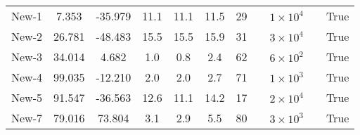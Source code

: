 \begin{table}
\begin{tabular}{ccccccccccc}
New-1 & 7.353 & -35.979 & 11.1 & 11.1 & 11.5 & 29 & \citet{ibata:2023} & $1 \times 10^{4}$ &  & True \\
New-2 & 26.781 & -48.483 & 15.5 & 15.5 & 15.9 & 31 & \citet{ibata:2023} & $3 \times 10^{4}$ &  & True \\
New-3 & 34.014 & 4.682 & 1.0 & 0.8 & 2.4 & 62 & \citet{ibata:2023} & $6 \times 10^{2}$ &  & True \\
New-4 & 99.035 & -12.210 & 2.0 & 2.0 & 2.7 & 71 & \citet{ibata:2023} & $1 \times 10^{3}$ &  & True \\
New-5 & 91.547 & -36.563 & 12.6 & 11.1 & 14.2 & 17 & \citet{ibata:2023} & $2 \times 10^{4}$ &  & True \\
New-7 & 79.016 & 73.804 & 3.1 & 2.9 & 5.5 & 80 & \citet{ibata:2023} & $3 \times 10^{3}$ &  & True \\
\hline \hline
\end{tabular}
\end{table}
